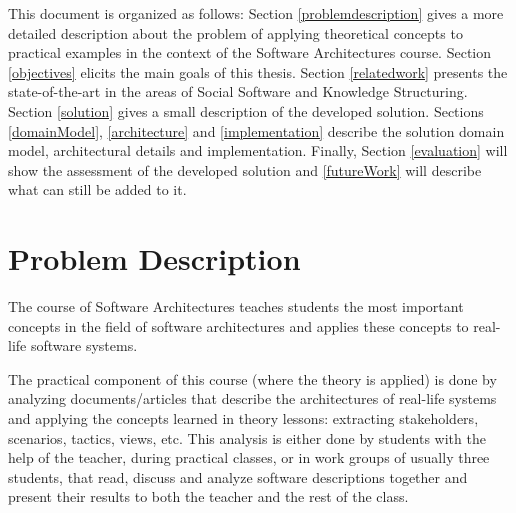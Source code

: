 \documentclass{llncs}
\begin{document}
This document is organized as follows: Section \ref{problemdescription} gives a more detailed description about the problem of applying theoretical concepts to practical examples in the context of the Software Architectures course. Section \ref{objectives} elicits the main goals of this thesis. Section \ref{relatedwork} presents the state-of-the-art in the areas of Social Software and Knowledge Structuring. Section \ref{solution} gives a small description of the developed solution. Sections \ref{domainModel}, \ref{architecture} and \ref{implementation} describe the solution domain model, architectural details and implementation. Finally, Section \ref{evaluation} will show the assessment of the developed solution and \ref{futureWork} will describe what can still be added to it.

\section{Problem Description}
\label{problemDescription}
The course of Software Architectures teaches students the most important concepts in the field of software architectures and applies these concepts to real-life software systems.

The practical component of this course (where the theory is applied) is done by analyzing documents/articles that describe the architectures of real-life systems and applying the concepts learned in theory lessons: extracting stakeholders, scenarios, tactics, views, etc.
This analysis is either done by students with the help of the teacher, during practical classes, or in work groups of usually three students, that read, discuss and analyze software descriptions together and present their results to both the teacher and the rest of the class.
\end{document}
